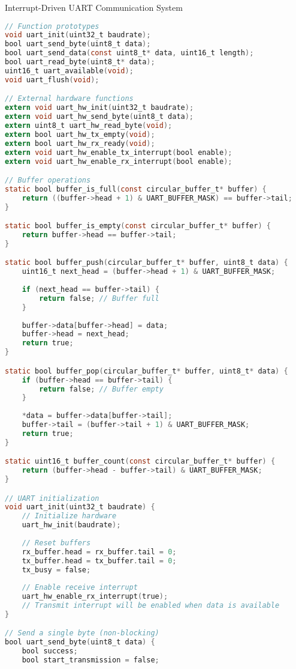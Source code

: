 \begin{example2}{Interrupt-Driven UART Communication System}
\begin{lstlisting}[language=C, style=basesmol]
// Function prototypes
void uart_init(uint32_t baudrate);
bool uart_send_byte(uint8_t data);
bool uart_send_data(const uint8_t* data, uint16_t length);
bool uart_read_byte(uint8_t* data);
uint16_t uart_available(void);
void uart_flush(void);

// External hardware functions
extern void uart_hw_init(uint32_t baudrate);
extern void uart_hw_send_byte(uint8_t data);
extern uint8_t uart_hw_read_byte(void);
extern bool uart_hw_tx_empty(void);
extern bool uart_hw_rx_ready(void);
extern void uart_hw_enable_tx_interrupt(bool enable);
extern void uart_hw_enable_rx_interrupt(bool enable);

// Buffer operations
static bool buffer_is_full(const circular_buffer_t* buffer) {
    return ((buffer->head + 1) & UART_BUFFER_MASK) == buffer->tail;
}

static bool buffer_is_empty(const circular_buffer_t* buffer) {
    return buffer->head == buffer->tail;
}

static bool buffer_push(circular_buffer_t* buffer, uint8_t data) {
    uint16_t next_head = (buffer->head + 1) & UART_BUFFER_MASK;
    
    if (next_head == buffer->tail) {
        return false; // Buffer full
    }
    
    buffer->data[buffer->head] = data;
    buffer->head = next_head;
    return true;
}

static bool buffer_pop(circular_buffer_t* buffer, uint8_t* data) {
    if (buffer->head == buffer->tail) {
        return false; // Buffer empty
    }
    
    *data = buffer->data[buffer->tail];
    buffer->tail = (buffer->tail + 1) & UART_BUFFER_MASK;
    return true;
}

static uint16_t buffer_count(const circular_buffer_t* buffer) {
    return (buffer->head - buffer->tail) & UART_BUFFER_MASK;
}

// UART initialization
void uart_init(uint32_t baudrate) {
    // Initialize hardware
    uart_hw_init(baudrate);
    
    // Reset buffers
    rx_buffer.head = rx_buffer.tail = 0;
    tx_buffer.head = tx_buffer.tail = 0;
    tx_busy = false;
    
    // Enable receive interrupt
    uart_hw_enable_rx_interrupt(true);
    // Transmit interrupt will be enabled when data is available
}

// Send a single byte (non-blocking)
bool uart_send_byte(uint8_t data) {
    bool success;
    bool start_transmission = false;
    

\end{lstlisting}
\end{example2}
